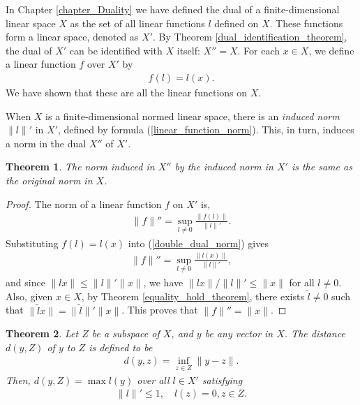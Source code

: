 \documentclass[11pt]{book}
\newtheorem{theorem}{Theorem}[section]
\theoremstyle{definition}
\numberwithin{equation}{chapter}
\begin{document}
\medskip

In Chapter \ref{chapter_Duality} we have defined the dual of a finite-dimensional linear space $X$ as the set of all linear functions $l$ defined on $X$. These functions form a linear space, denoted as $X'$. By Theorem \ref{dual_identification_theorem}, the dual of $X'$ can be identified with $X$ itself: $X'' = X$. For each $x \in X$, we define a linear function $f$ over $X'$ by 
\begin{align*}
    f(l) = l(x).
\end{align*}
We have shown that these are all the linear functions on $X$. 

When $X$ is a finite-dimensional normed linear space, there is an {\em induced norm} $\|l\|'$ in $X'$, defined by formula (\ref{linear_function_norm}). This, in turn, induces a norm in the dual $X''$ of $X'$.

\medskip

\begin{theorem}
The norm induced in $X''$ by the induced norm in $X'$ is the same as the original norm in $X$.
\end{theorem}
\begin{proof}
The norm of a linear function $f$ on $X'$ is, 
\begin{align}\label{double_dual_norm}
    \|f\|'' = \sup_{l \neq 0} \frac{\|f(l)\|}{\|l\|'}.
\end{align}
Substituting $f(l) = l(x)$ into (\ref{double_dual_norm}) gives
\begin{align*}
    \|f\|'' = \sup_{l \neq 0} \frac{\|l(x)\|}{\|l\|'},
\end{align*}
and since $\|lx\| \leq \|l\|' \|x\|$, we have $\|lx\|/\|l\|' \leq \|x\|$ for all $l \neq 0$. Also, given $x \in X$, by Theorem \ref{equality_hold_theorem}, there exists $\tilde{l} \neq 0$ such that $\|\tilde{l}x\| = \|\tilde{l}\|' \|x\|$. This proves that $\|f\|'' = \|x\|$.
\end{proof}

\medskip

\begin{theorem}
Let $Z$ be a subspace of $X$, and $y$ be any vector in $X$. The distance $d(y,Z)$ of $y$ to $Z$ is defined to be
\begin{align*}
    d(y,z) = \inf_{z \in Z} \|y - z\|.
\end{align*}
Then, $d(y,Z) = \max l(y)$ over all $l \in X'$ satisfying 
\begin{align*}
    \|l\|' \leq 1, \quad l(z) = 0, z \in Z.
\end{align*}
\end{theorem}
\end{document}
